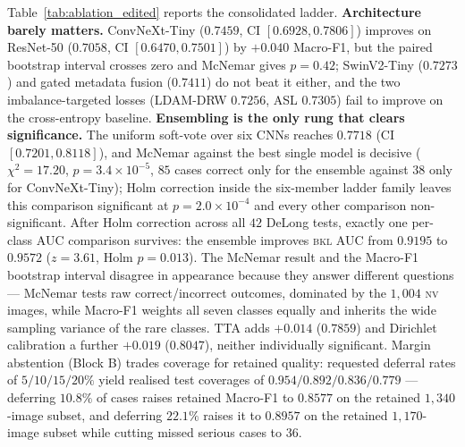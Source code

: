 \documentclass[journal]{IEEEtran}
\begin{document}


Table~\ref{tab:ablation_edited} reports the consolidated ladder. \textbf{Architecture barely
matters.} ConvNeXt-Tiny ($0.7459$, CI $[0.6928, 0.7806]$) improves on ResNet-50 ($0.7058$, CI
$[0.6470, 0.7501]$) by $+0.040$ Macro-F1, but the paired bootstrap interval crosses zero and
McNemar gives $p=0.42$; SwinV2-Tiny ($0.7273$) and gated metadata fusion ($0.7411$) do not beat
it either, and the two imbalance-targeted losses (LDAM-DRW $0.7256$, ASL $0.7305$) fail to
improve on the cross-entropy baseline. \textbf{Ensembling is the only rung that clears
significance.} The uniform soft-vote over six CNNs reaches $0.7718$ (CI $[0.7201, 0.8118]$),
and McNemar against the best single model is decisive ($\chi^2=17.20$,
$p=3.4\times10^{-5}$, $85$ cases correct only for the ensemble against $38$ only for
ConvNeXt-Tiny); Holm correction inside the six-member ladder family leaves this comparison
significant at $p=2.0\times10^{-4}$ and every other comparison non-significant. After Holm
correction across all $42$ DeLong tests, exactly one per-class AUC comparison survives: the
ensemble improves \textsc{bkl} AUC from $0.9195$ to $0.9572$ ($z=3.61$, Holm $p=0.013$). The
McNemar result and the Macro-F1 bootstrap interval disagree in appearance because they answer
different questions --- McNemar tests raw correct/incorrect outcomes, dominated by the
$1{,}004$ \textsc{nv} images, while Macro-F1 weights all seven classes equally and inherits the
wide sampling variance of the rare classes. TTA adds $+0.014$ ($0.7859$) and Dirichlet
calibration a further $+0.019$ ($0.8047$), neither individually significant. Margin abstention
(Block B) trades coverage for retained quality: requested deferral rates of $5/10/15/20\%$
yield realised test coverages of $0.954/0.892/0.836/0.779$ --- deferring $10.8\%$ of cases
raises retained Macro-F1 to $0.8577$ on the retained $1{,}340$-image subset, and deferring
$22.1\%$ raises it to $0.8957$ on the retained $1{,}170$-image subset while cutting missed
serious cases to $36$.
\end{document}

